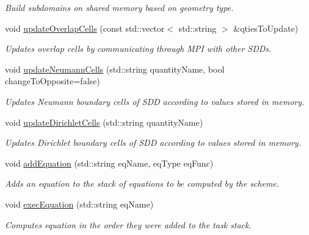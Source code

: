 \begin{DoxyCompactItemize}
\begin{DoxyCompactList}\small\item\em Build subdomains on shared memory based on geometry type. \end{DoxyCompactList}\item 
void \hyperlink{classSDDistributed_a467f8c05c2cf7728828ec9d0c617e667}{update\+Overlap\+Cells} (const std\+::vector$<$ std\+::string $>$ \&qties\+To\+Update)
\begin{DoxyCompactList}\small\item\em Updates overlap cells by communicating through M\+PI with other S\+D\+Ds. \end{DoxyCompactList}\item 
void \hyperlink{classSDDistributed_a492c6799b5b1f79481a2ee6e50979a18}{update\+Neumann\+Cells} (std\+::string quantity\+Name, bool change\+To\+Opposite=false)
\begin{DoxyCompactList}\small\item\em Updates Neumann boundary cells of S\+DD according to values stored in memory. \end{DoxyCompactList}\item 
void \hyperlink{classSDDistributed_a0eaa89db3fd4b663d887de8dcf9f65af}{update\+Dirichlet\+Cells} (std\+::string quantity\+Name)
\begin{DoxyCompactList}\small\item\em Updates Dirichlet boundary cells of S\+DD according to values stored in memory. \end{DoxyCompactList}\item 
void \hyperlink{classSDDistributed_a0974e2cce9bfcddfd0acccd1105d980f}{add\+Equation} (std\+::string eq\+Name, eq\+Type eq\+Func)
\begin{DoxyCompactList}\small\item\em Adds an equation to the stack of equations to be computed by the scheme. \end{DoxyCompactList}\item 
\mbox{\label{classSDDistributed_a00a539076c306457a4dd1aef2c4f2039}} 
void \hyperlink{classSDDistributed_a00a539076c306457a4dd1aef2c4f2039}{exec\+Equation} (std\+::string eq\+Name)
\begin{DoxyCompactList}\small\item\em Computes equation in the order they were added to the task stack. \end{DoxyCompactList}\item 

\end{DoxyCompactItemize}
